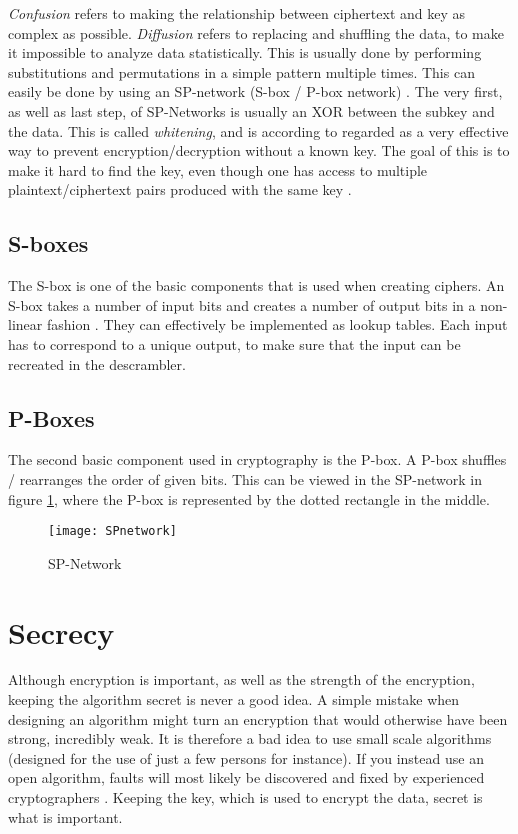 \emph{Confusion} refers to making the relationship between ciphertext 
and key as complex as possible. \emph{Diffusion} refers to replacing 
and shuffling the data, to make it impossible to analyze data 
statistically. This is usually done by performing substitutions and 
permutations in a simple pattern multiple times. This can easily be 
done by using an SP-network (S-box / P-box network) 
\citep[pp. 74--79]{Stinson:2006}. The very first, as well as last step, 
of SP-Networks is usually an XOR between the subkey and the data. This 
is called \emph{whitening}, and is according to 
\citet[p. 75]{Stinson:2006} regarded as a very effective way to prevent 
encryption/decryption without a known key. The goal of this is to make 
it hard to find the key, even though one has access to multiple 
plaintext/ciphertext pairs produced with the same key 
\citep{Shannon:1949}.

\subsection{S-boxes}
The S-box is one of the basic components that is used when creating 
ciphers. An S-box takes a number of input bits and creates a number of 
output bits in a non-linear fashion \citep[pp. 74--75]{Stinson:2006}. 
They can effectively be implemented as lookup tables. Each input has to 
correspond to a unique output, to make sure that the input can be 
recreated in the descrambler.


\subsection{P-Boxes}
The second basic component used in cryptography is the P-box. A P-box 
shuffles / rearranges the order of given bits. This can be viewed in 
the SP-network in figure \ref{img:SPNetwork}, where the P-box is 
represented by the dotted rectangle in the middle.

\begin{figure}
  \begin{center}
    \texttt{[image: SPnetwork]}
    \caption{SP-Network}
    \label{img:SPNetwork}
  \end{center}
\end{figure}


\section{Secrecy}
Although encryption is important, as well as the strength of the 
encryption, keeping the algorithm secret is never a good idea. A simple 
mistake when designing an algorithm might turn an encryption that would 
otherwise have been strong, incredibly weak. It is therefore a bad 
idea to use small scale algorithms (designed for the use of just a few 
persons for instance). If you instead use an open algorithm, faults 
will most likely be discovered and fixed by experienced cryptographers 
\citep[pp. 23]{Schneier:2003}. Keeping the key, which is used to 
encrypt the data, secret is what is important.
